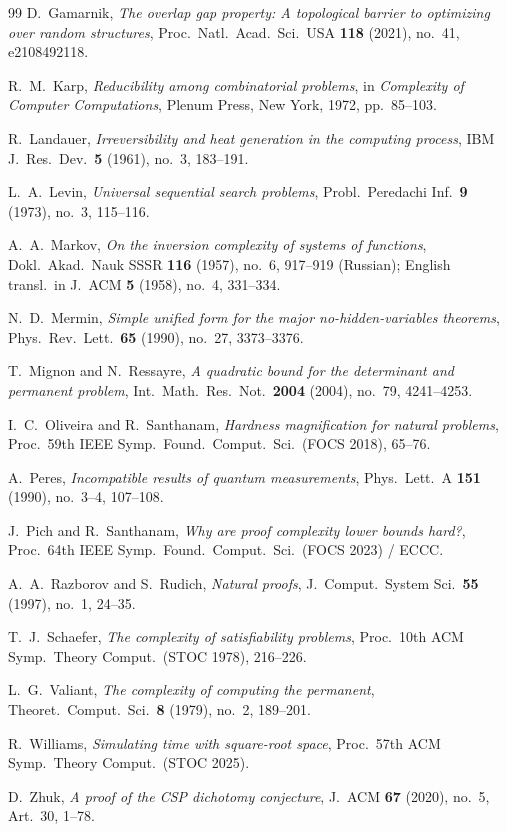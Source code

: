 \documentclass[11pt,reqno]{amsart}
\theoremstyle{definition}
\begin{document}
\begin{thebibliography}{99}
D.~Gamarnik,
\emph{The overlap gap property: A topological barrier to optimizing over random structures},
Proc.\ Natl.\ Acad.\ Sci.\ USA \textbf{118} (2021), no.~41, e2108492118.

R.~M.~Karp,
\emph{Reducibility among combinatorial problems},
in \emph{Complexity of Computer Computations}, Plenum Press, New York, 1972, pp.~85--103.

R.~Landauer,
\emph{Irreversibility and heat generation in the computing process},
IBM J.\ Res.\ Dev.\ \textbf{5} (1961), no.~3, 183--191.

L.~A.~Levin,
\emph{Universal sequential search problems},
Probl.\ Peredachi Inf.\ \textbf{9} (1973), no.~3, 115--116.

A.~A.~Markov,
\emph{On the inversion complexity of systems of functions},
Dokl.\ Akad.\ Nauk SSSR \textbf{116} (1957), no.~6, 917--919 (Russian);
English transl.\ in J.\ ACM \textbf{5} (1958), no.~4, 331--334.

N.~D.~Mermin,
\emph{Simple unified form for the major no-hidden-variables theorems},
Phys.\ Rev.\ Lett.\ \textbf{65} (1990), no.~27, 3373--3376.

T.~Mignon and N.~Ressayre,
\emph{A quadratic bound for the determinant and permanent problem},
Int.\ Math.\ Res.\ Not.\ \textbf{2004} (2004), no.~79, 4241--4253.

I.~C.~Oliveira and R.~Santhanam,
\emph{Hardness magnification for natural problems},
Proc.\ 59th IEEE Symp.\ Found.\ Comput.\ Sci.\ (FOCS 2018), 65--76.

A.~Peres,
\emph{Incompatible results of quantum measurements},
Phys.\ Lett.\ A \textbf{151} (1990), no.~3--4, 107--108.

J.~Pich and R.~Santhanam,
\emph{Why are proof complexity lower bounds hard?},
Proc.\ 64th IEEE Symp.\ Found.\ Comput.\ Sci.\ (FOCS 2023) / ECCC.

A.~A.~Razborov and S.~Rudich,
\emph{Natural proofs},
J.\ Comput.\ System Sci.\ \textbf{55} (1997), no.~1, 24--35.

T.~J.~Schaefer,
\emph{The complexity of satisfiability problems},
Proc.\ 10th ACM Symp.\ Theory Comput.\ (STOC 1978), 216--226.

L.~G.~Valiant,
\emph{The complexity of computing the permanent},
Theoret.\ Comput.\ Sci.\ \textbf{8} (1979), no.~2, 189--201.

R.~Williams,
\emph{Simulating time with square-root space},
Proc.\ 57th ACM Symp.\ Theory Comput.\ (STOC 2025).

D.~Zhuk,
\emph{A proof of the CSP dichotomy conjecture},
J.\ ACM \textbf{67} (2020), no.~5, Art.~30, 1--78.

\end{thebibliography}
\end{document}
